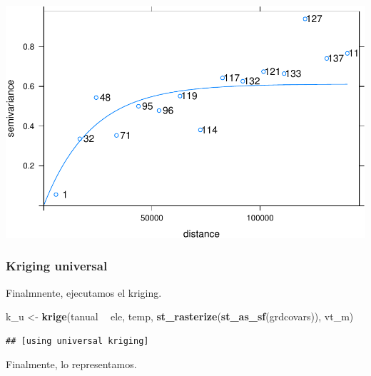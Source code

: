 \documentclass[11pt,]{article}
\newenvironment{Shaded}{\begin{snugshade}}{\end{snugshade}}
\newcommand{\KeywordTok}[1]{\textcolor[rgb]{0.13,0.29,0.53}{\textbf{#1}}}
\newcommand{\StringTok}[1]{\textcolor[rgb]{0.31,0.60,0.02}{#1}}
\newcommand{\OperatorTok}[1]{\textcolor[rgb]{0.81,0.36,0.00}{\textbf{#1}}}
\newcommand{\NormalTok}[1]{#1}
\begin{document}
\includegraphics[width=800px]{Proyecto-Precipitaciones_files/figure-latex/vgm-temp-ajus-1}

\subsubsection{Kriging universal}\label{kriging-universal}

Finalmnente, ejecutamos el kriging.

\begin{Shaded}
\begin{Highlighting}[]
\NormalTok{k_u <-}\StringTok{ }\KeywordTok{krige}\NormalTok{(tanual }\OperatorTok{~}\StringTok{ }\NormalTok{ele, temp, }\KeywordTok{st_rasterize}\NormalTok{(}\KeywordTok{st_as_sf}\NormalTok{(grdcovars)), vt_m)}
\end{Highlighting}
\end{Shaded}

\begin{verbatim}
## [using universal kriging]
\end{verbatim}

Finalmente, lo representamos.
\end{document}
